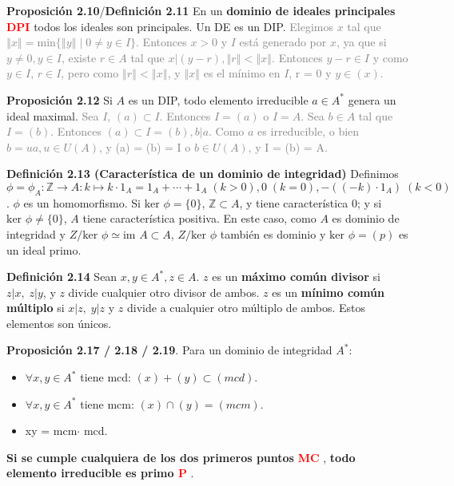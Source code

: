 \documentclass[a4paper, 11pt]{extarticle}
\newcommand{\propo}[1]{\textcolor{rojo}{\textbf{Proposición #1}}}
\newcommand{\defi}[1]{\textcolor{azul}{\textbf{Definición #1}}}
\begin{document}
\propo{2.10}/\defi{2.11} En un \textbf{dominio de ideales principales \textcolor{red}{DPI}}
todos los ideales son principales. Un DE es un DIP. 
\textcolor{gray}{\footnotesize Elegimos \( x \) tal que \( \left\Vert x \right\Vert = \text{min}\{ \left\Vert y \right\Vert  \;|\; 0 \neq y \in I  \} \). 
Entonces \( x > 0 \) y \( I  \) está generado por \( x \), ya que si \( y \neq 0, y \in I  \),
existe \( r \in A \) tal que \( x|(y-r), \left\Vert r \right\Vert < \left\Vert x \right\Vert  \). Entonces \( y-r \in I  \) y como \( y \in I  \),
\( r \in I \), pero como \( \left\Vert r \right\Vert < \left\Vert x \right\Vert  \), y \( \left\Vert x \right\Vert  \) es el mínimo en \( I  \), r = 0 y \( y \in (x) \).}

\propo{2.12} Si \(A\) es un DIP, todo elemento irreducible \(a \in A^*\)
genera un ideal maximal. 
\textcolor{gray}{\footnotesize Sea \( I  \), \( (a) \subset I  \). Entonces \( I = (a) \) o 
\( I = A \). Sea \( b \in A \) tal que \( I = (b) \). Entonces \( (a) \subset I = (b), b | a \). 
Como \( a \) es irreducible, o bien \( b = ua, u \in U(A) \), y (a) = (b) = I \) o \( b \in U(A) \), y I = (b) = A.}

\defi{2.13 (Característica de un dominio de integridad)} Definimos \(\phi =
\phi_A: \mathbb{Z} \rightarrow A: k \mapsto k\cdot 1_A = 1_A + \cdots + 1_A\; (k >
0), 0\; (k = 0), -((-k) \cdot 1_A)\; (k < 0)\). \(\phi\) es un homomorfismo.
Si \(\text{ker }\phi = \{ 0 \}\), \(\mathbb{Z} \subset A\), y tiene
característica 0; y si \(\text{ker }\phi \neq \{ 0 \}\), \(A\) tiene
característica positiva. En este caso, como \(A\) es dominio de integridad y
\(Z/\text{ker }\phi \simeq \text{im } A \subset A\), \(Z/\text{ker } \phi\)
también es dominio y \(\text{ker }\phi = (p)\) es un ideal primo.

\defi{2.14} Sean \(x,y \in A^*, z \in A\). \(z\) es un \textbf{máximo común divisor}
si \(z|x, \; z|y\), y \(z\) divide cualquier otro divisor de ambos. 
\(z\) es un \textbf{mínimo común múltiplo} si \(x|z, \; y|z\) y \(z\) divide a
cualquier otro múltiplo de ambos. Estos elementos son únicos.

\propo{2.17 / 2.18 / 2.19}. Para un dominio de integridad \(A^*\): \vspace{-1em}
\begin{itemize}
\item \(\forall x,y \in A^*\) tiene mcd: \((x) + (y) \subset (mcd)\).
\item \(\forall x,y \in A^*\) tiene mcm: \((x) \cap (y) = (mcm)\).
\item xy = mcm\(\cdot\) mcd.
\end{itemize}
\textbf{Si se cumple cualquiera de los dos primeros puntos} \textbf{\textcolor{red}{MC}} , 
\textbf{todo elemento irreducible es primo \textcolor{red}{P}} . 
\end{document}
